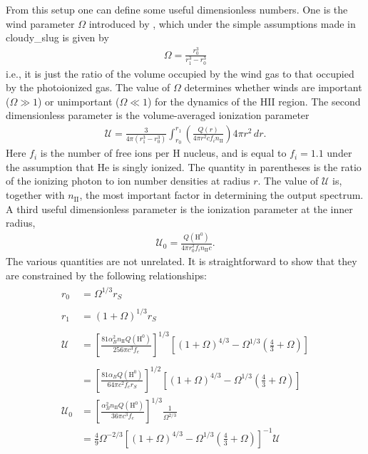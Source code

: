 \documentclass[letterpaper,10pt,english]{sphinxmanual}
\begin{document}
From this setup one can define some useful dimensionless numbers. One
is the wind parameter \(\Omega\) introduced by , which under the
simple assumptions made in cloudy\_slug is given by
\begin{equation*}
\begin{split}\Omega = \frac{r_0^3}{r_1^3-r_0^3}\end{split}
\end{equation*}
i.e., it is just the ratio of the volume occupied by the wind gas to
that occupied by the photoionized gas. The value of \(\Omega\)
determines whether winds are important (\(\Omega \gg 1\)) or
unimportant (\(\Omega \ll 1\)) for the dynamics of the HII
region. The second dimensionless parameter is the volume-averaged
ionization parameter
\begin{equation*}
\begin{split}\mathcal{U} = \frac{3}{4\pi (r_1^3-r_0^3)} \int_{r_0}^{r_1}
\left(\frac{Q(r)}{4\pi r^2 c f_i n_{\mathrm{II}}}\right)
4\pi r^2 \, dr.\end{split}
\end{equation*}
Here \(f_i\) is the number of free ions per H nucleus, and is
equal to \(f_i = 1.1\) under the assumption that He is singly
ionized. The quantity in parentheses is the ratio of the ionizing
photon to ion number densities at radius \(r\). The value of
\(\mathcal{U}\) is, together with \(n_{\mathrm{II}}\), the
most important factor in determining the output spectrum. A third
useful dimensionless parameter is the ionization parameter at the
inner radius,
\begin{equation*}
\begin{split}\mathcal{U}_0 = \frac{Q(\mathrm{H}^0)}
{4\pi r_0^2 f_i n_{\mathrm{II}} c}.\end{split}
\end{equation*}
The various quantities are not unrelated. It is straightforward to
show that they are constrained by the following relationships:
\begin{align*}\!\begin{aligned}
r_0 & = \Omega^{1/3} r_S \\\\
r_1 & = \left(1 + \Omega\right)^{1/3} r_S \\\\
\mathcal{U} & = \left[\frac{81 \alpha_B^2 n_{\mathrm{II}}
Q(\mathrm{H}^0)}{256 \pi c^3 f_e}\right]^{1/3}
\left[\left(1 + \Omega\right)^{4/3}
- \Omega^{1/3} \left(\frac{4}{3}+\Omega\right)\right] \\\\
& = \left[\frac{81 \alpha_B Q(\mathrm{H}^0)}
{64 \pi c^2 f_e r_S}\right]^{1/2}
\left[\left(1 + \Omega\right)^{4/3}
- \Omega^{1/3} \left(\frac{4}{3}+\Omega\right)\right]\\
\mathcal{U}_0 &= \left[
\frac{\alpha_B^2 n_{\mathrm{II}} Q(\mathrm{H}^0)}
{36 \pi c^3 f_e}\right]^{1/3} \frac{1}{\Omega^{2/3}}\\
&= \frac{4}{9}\Omega^{-2/3} \left[(1+\Omega)^{4/3} -
\Omega^{1/3}\left(\frac{4}{3}+\Omega\right)\right]^{-1}
\mathcal{U}\\
\end{aligned}\end{align*}
\end{document}
